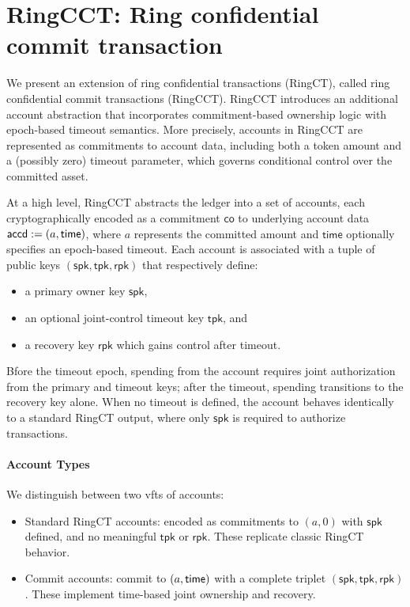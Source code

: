 
\section{RingCCT: Ring confidential commit transaction}
We present an extension of ring confidential transactions (RingCT), called ring confidential commit transactions (RingCCT).
RingCCT introduces an additional account abstraction that incorporates commitment-based ownership logic with epoch-based timeout semantics. More precisely, accounts in RingCCT are represented as commitments to account data, including both a token amount and a (possibly zero) timeout parameter, which governs conditional control over the committed asset.

At a high level, RingCCT abstracts the ledger into a set of accounts, each cryptographically encoded as a commitment $\mathsf{co}$ to underlying account data $\mathsf{accd} := (a, \mathsf{time})$, where $a$ represents the committed amount and $\mathsf{time}$ optionally specifies an epoch-based timeout. Each account is associated with a tuple of public keys $(\mathsf{spk}, \mathsf{tpk}, \mathsf{rpk})$ that respectively define:

\begin{itemize}
	\item a primary owner key $\mathsf{spk}$,

	\item an optional joint-control timeout key $\mathsf{tpk}$, and

	\item a recovery key $\mathsf{rpk}$ which gains control after timeout.
\end{itemize}

Bfore the timeout epoch, spending from the account requires joint authorization from the primary and timeout keys; after the timeout, spending transitions to the recovery key alone. When no timeout is defined, the account behaves identically to a standard RingCT output, where only $\mathsf{spk}$ is required to authorize transactions.

\paragraph*{Account Types} We distinguish between two vfts of accounts:

\begin{itemize}
	\item Standard RingCT accounts: encoded as commitments to $(a, 0)$ with $\mathsf{spk}$ defined, and no meaningful $\mathsf{tpk}$ or $\mathsf{rpk}$. These replicate classic RingCT behavior.

	\item Commit accounts: commit to $(a, \mathsf{time})$ with a complete triplet $(\mathsf{spk}, \mathsf{tpk}, \mathsf{rpk})$. These implement time-based joint ownership and recovery.
\end{itemize}

